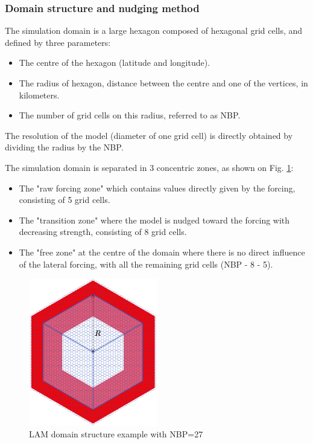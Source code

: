 \subsubsection{Domain structure and nudging method}

The simulation domain is a large hexagon composed of hexagonal grid cells, and defined by three parameters:
\begin{itemize}
    \item The centre of the hexagon (latitude and longitude).
    \item The radius of hexagon, distance between the centre and one of the vertices, in kilometers.
    \item The number of grid cells on this radius, referred to as NBP.
\end{itemize}

The resolution of the model (diameter of one grid cell) is directly obtained by dividing the radius by the NBP.

\hfill

The simulation domain is separated in 3 concentric zones, as shown on Fig. \ref{fig:LAM_domain}: 
\begin{itemize}
    \item The "raw forcing zone" which contains values directly given by the forcing, consisting of 5 grid cells.
    \item The "transition zone"  where the model is nudged toward the forcing with decreasing strength, consisting of 8 grid cells.
    \item The "free zone" at the centre of the domain where there is no direct influence of the lateral forcing, with all the remaining grid cells (NBP - 8 - 5).
\end{itemize} 

\begin{figure}[ht]
    \centering
    \includegraphics[width=0.5\textwidth]{images/methods/LAM_domain_zones.png}
    \caption{LAM domain structure example with NBP=27 \citep[from][]{raillard_leveraging_2024}}
    \label{fig:LAM_domain}
\end{figure}

